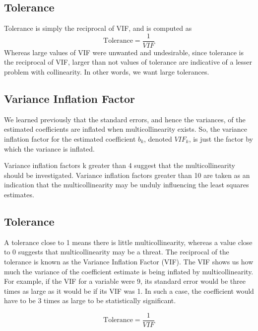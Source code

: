 \documentclass[a4paper,12pt]{article}
\begin{document}
\subsection{Tolerance}

Tolerance is simply the reciprocal of VIF, and is computed as
\[ \mbox{Tolerance} = \frac{1}{VIF}\]
Whereas large values of VIF were unwanted and undesirable, since tolerance is the reciprocal of VIF, larger than not values of tolerance are indicative of a lesser problem with collinearity. In other words, we want large tolerances.


\subsection{Variance Inflation Factor}



We learned previously that the standard errors, and hence the variances, of 
the estimated coefficients are inflated when multicollinearity exists. 
So, the variance inflation factor for the estimated coefficient $b_k$, denoted $VIF_k$, 
is just the factor by which the variance is inflated. 

Variance inflation factors k greater than 4 suggest that the multicollinearity should be investigated. 
Variance inflation factors greater than 10 are taken as an indication that the multicollinearity may be unduly influencing the least squares estimates. 


\subsection{Tolerance}
A tolerance close to 1 means there is little multicollinearity, whereas a value close to 0 suggests that multicollinearity may be a threat. The reciprocal of the tolerance is known as the Variance Inflation Factor (VIF). The VIF shows us how much the variance of the coefficient estimate is being inflated by multicollinearity. For example, if the VIF for a variable were 9, its standard error would be three times as large as it would be if its VIF was 1. In such a case, the coefficient would have to be 3 times as large to be statistically significant.

\[ \mbox{Tolerance} = \frac{1}{VIF}\]
\end{document}
